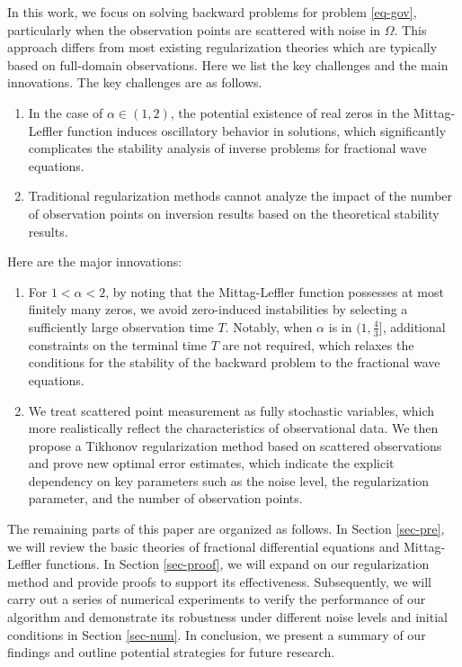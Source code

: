 \documentclass[11pt]{article}
\numberwithin{equation}{section}
\begin{document}
In this work, we focus on solving backward problems for problem \eqref{eq-gov}, particularly when the observation points are scattered with noise in $\Omega$. This approach differs from most existing regularization theories which are typically based on full-domain observations. Here we list the key challenges and the main innovations. The key challenges are as follows.
\begin{enumerate}
    \item In the case of $\alpha \in (1, 2)$, the potential existence of real zeros in the Mittag-Leffler function induces oscillatory behavior in solutions, which significantly complicates the stability analysis of inverse problems for fractional wave equations.

    \item Traditional regularization methods cannot analyze the impact of the number of observation points on inversion results based on the theoretical stability results.
\end{enumerate}
Here are the major innovations:
\begin{enumerate}
    \item For $1 < \alpha < 2$, by noting that the Mittag-Leffler function possesses at most finitely many zeros, we avoid zero-induced instabilities by selecting a sufficiently large observation time $T$.  Notably, when $\alpha$ is in $(1, \frac{4}{3}]$, additional constraints on the terminal time $T$ are not required, which relaxes the conditions for the stability of the backward problem to the fractional wave equations.
    \item We treat scattered point measurement as fully stochastic variables, which more realistically reflect the characteristics of observational data. We then propose a Tikhonov regularization method based on scattered observations and prove new optimal error estimates, which indicate the explicit dependency on key parameters such as the noise level, the regularization parameter, and the number of observation points.
\end{enumerate}

The remaining parts of this paper are organized as follows. In Section \ref{sec-pre}, we will review the basic theories of fractional differential equations and Mittag-Leffler functions. In Section \ref{sec-proof}, we will expand on our regularization method and provide proofs to support its effectiveness. Subsequently, we will carry out a series of numerical experiments to verify the performance of our algorithm and demonstrate its robustness under different noise levels and initial conditions in Section  \ref{sec-num}. In conclusion, we present a summary of our findings and outline potential strategies for future research.
\end{document}
